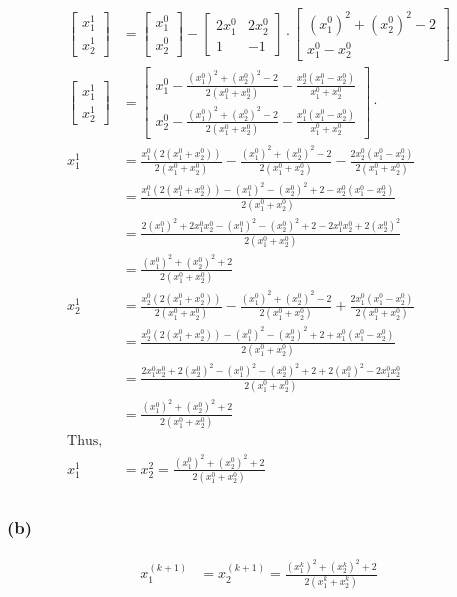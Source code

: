 \documentclass{article}
\begin{document}
\begin{align*}
    \begin{bmatrix} x_1^1 \\[1ex] x_2^1\end{bmatrix} &= \begin{bmatrix} x_1^0 \\[1ex] x_2^0\end{bmatrix} - \begin{bmatrix} 2x_1^0 & 2x_2^0 \\[1ex] 1 & -1\end{bmatrix} \cdot \begin{bmatrix} (x_1^0)^2+(x_2^0)^2 -2 \\[1ex] x_1^0 - x_2^0 \end{bmatrix} \\
    \begin{bmatrix} x_1^1 \\[1ex] x_2^1\end{bmatrix} &=  \begin{bmatrix} x_1^0- \frac{(x_1^0)^2 + (x_2^0)^2 -2}{2(x_1^0+x_2^0)} - \frac{x_2^0 (x_1^0 - x_2^0)}{x_1^0 + x_2^0} \\[1ex] x_2^0 - \frac{(x_1^0)^2 + (x_2^0)^2 -2}{2(x_1^0+x_2^0)} - \frac{x_1^0 (x_1^0 - x_2^0)}{x_1^0 + x_2^0} \end{bmatrix} \cdot  \\
    x_1^1 &=  \frac{x_1^0(2(x_1^0 + x_2^0))}{2(x_1^0+x_2^0)} - \frac{(x_1^0)^2 + (x_2^0)^2 - 2 }{2(x_1^0+x_2^0)} - \frac{2x_2^0(x_1^0 - x_2^0)}{2(x_1^0+x_2^0)} \\
    &= \frac{x_1^0(2(x_1^0 + x_2^0))-(x_1^0)^2 - (x_2^0)^2 + 2 - x_2^0(x_1^0 - x_2^0)}{2(x_1^0+x_2^0)}\\
    &=  \frac{2(x_1^0)^2 + 2x_1^0x_2^0 - (x_1^0)^2 - (x_2^0)^2 +2 - 2x_1^0x_2^0 + 2(x_2^0)^2}{2(x_1^0+x_2^0)}\\
    &=  \frac{(x_1^0)^2 + (x_2^0)^2 + 2 }{2(x_1^0+x_2^0)}\\
    x_2^1 &=  \frac{x_2^0(2(x_1^0 + x_2^0))}{2(x_1^0+x_2^0)} - \frac{(x_1^0)^2 + (x_2^0)^2 - 2 }{2(x_1^0+x_2^0)} + \frac{2x_1^0(x_1^0 - x_2^0)}{2(x_1^0+x_2^0)} \\
    &= \frac{x_2^0(2(x_1^0 + x_2^0))-(x_1^0)^2 - (x_2^0)^2 + 2 + x_1^0(x_1^0 - x_2^0)}{2(x_1^0+x_2^0)}\\
    &= \frac{2x_1^0x_2^0 + 2(x_2^0)^2 - (x_1^0)^2 - (x_2^0)^2 + 2 + 2(x_1^0)^2 - 2x_1^0x_2^0}{2(x_1^0+x_2^0)}\\
    &= \frac{(x_1^0)^2 + (x_2^0)^2 +2}{2(x_1^0 + x_2^0)}\\
    \text{Thus,}&\\
    x_1^1 &= x_2^2 =  \frac{(x_1^0)^2 + (x_2^0)^2 +2}{2(x_1^0 + x_2^0)}\\
\end{align*}

\subsubsection*{(b)}

\begin{align*}
    x_1^{(k+1)}&=x_2^{(k+1)}=\frac{(x_1^k)^2 + (x_2^k)^2 +2}{2(x_1^k + x_2^k)}\\
\end{align*}
\end{document}
